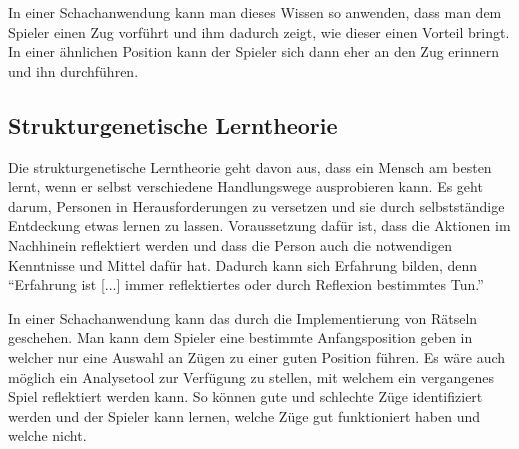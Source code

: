 In einer Schachanwendung kann man dieses Wissen so anwenden, dass man dem Spieler einen Zug vorführt und ihm dadurch zeigt,
wie dieser einen Vorteil bringt.
In einer ähnlichen Position kann der Spieler sich dann eher an den Zug erinnern und ihn durchführen.

\subsection{Strukturgenetische Lerntheorie}
Die strukturgenetische Lerntheorie geht davon aus, dass ein Mensch am besten lernt, wenn er selbst verschiedene Handlungswege ausprobieren kann. Es geht darum, Personen in Herausforderungen zu versetzen und sie durch selbstständige Entdeckung etwas lernen zu lassen. Voraussetzung dafür ist, dass die Aktionen im Nachhinein reflektiert werden und dass die Person auch die notwendigen Kenntnisse und Mittel dafür hat. Dadurch kann sich Erfahrung bilden, denn \enquote{Erfahrung ist [...] immer reflektiertes oder durch Reflexion bestimmtes Tun.}\cite{kron_grundwissen_2024}

In einer Schachanwendung kann das durch die Implementierung von Rätseln geschehen. Man kann dem Spieler eine bestimmte Anfangsposition geben in welcher nur eine Auswahl an Zügen zu einer guten Position führen. Es wäre auch möglich ein Analysetool zur Verfügung zu stellen, mit welchem ein vergangenes Spiel reflektiert werden kann. So können gute und schlechte Züge identifiziert werden und der Spieler kann lernen, welche Züge gut funktioniert haben und welche nicht.

